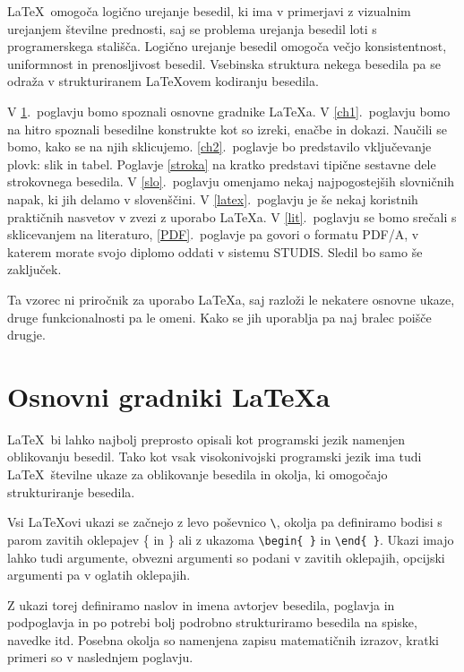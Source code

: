 \documentclass[a4paper, 12pt]{book}
\begin{document}
\LaTeX\ omogoča logično urejanje besedil, ki ima v primerjavi z vizualnim urejanjem številne prednosti, saj se problema urejanja besedil loti s programerskega stališča.
Logično urejanje besedil omogoča večjo konsistentnost, uniformnost in  prenosljivost besedil. 
Vsebinska struktura nekega besedila pa se odraža v strukturiranem \LaTeX ovem kodiranju besedila.

V \ref{ch0}.~poglavju bomo spoznali osnovne gradnike \LaTeX{a}.
V \ref{ch1}.~poglavju bomo na hitro spoznali besedilne konstrukte kot so izreki, enačbe in dokazi. 
Naučili se bomo, kako se na njih sklicujemo. 
\ref{ch2}.~poglavje bo predstavilo vključevanje plovk: slik in tabel. 
Poglavje \ref{stroka} na kratko predstavi tipične sestavne dele strokovnega besedila.
V \ref{slo}.~poglavju omenjamo nekaj najpogostejših slovničnih napak, ki jih delamo v slovenščini.
V \ref{latex}.~poglavju je še nekaj koristnih praktičnih nasvetov v zvezi z uporabo \LaTeX{a}.
V \ref{lit}.~poglavju se bomo srečali s sklicevanjem na literaturo,
\ref{PDF}.~poglavje pa govori o formatu PDF/A, v katerem morate svojo diplomo oddati v sistemu STUDIS.
Sledil bo samo še zaključek.

Ta vzorec ni priročnik za uporabo \LaTeX{a}, saj razloži le nekatere osnovne ukaze, druge funkcionalnosti pa le omeni. Kako se jih uporablja
pa naj bralec poišče drugje.


\chapter{Osnovni gradniki \LaTeX{a}}
\label{ch0}

\LaTeX\ bi lahko najbolj preprosto opisali kot programski jezik namenjen oblikovanju besedil.
Tako kot vsak visokonivojski programski jezik ima tudi \LaTeX\  številne ukaze za oblikovanje  besedila in okolja, ki omogočajo strukturiranje besedila.

Vsi \LaTeX ovi ukazi se začnejo z levo poševnico  \verb=\=, okolja pa definiramo bodisi s parom zavitih oklepajev \{ in \} ali z ukazoma \verb=\begin{ }= in   \verb=\end{ }=.
Ukazi imajo lahko tudi argumente, obvezni argumenti so podani v zavitih oklepajih, opcijski argumenti pa v oglatih oklepajih.

Z ukazi torej definiramo naslov in imena avtorjev besedila, poglavja in podpoglavja in po potrebi bolj podrobno strukturiramo besedila na spiske, navedke itd.
Posebna okolja so namenjena zapisu matematičnih izrazov, kratki primeri so v naslednjem poglavju.
\end{document}

